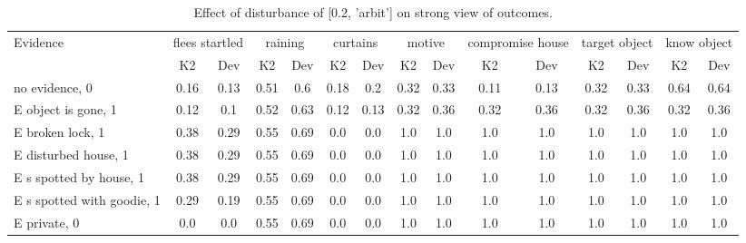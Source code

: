 \begin{table}\begin{tabular}{l|cc|cc|cc|cc|cc|cc|cc}\toprule\multirow{2}{*}{Evidence} & \multicolumn{2}{c}{flees startled}& \multicolumn{2}{c}{raining}& \multicolumn{2}{c}{curtains}& \multicolumn{2}{c}{motive}& \multicolumn{2}{c}{compromise house}& \multicolumn{2}{c}{target object}& \multicolumn{2}{c}{know object}\\& {K2} & {Dev}& {K2} & {Dev}& {K2} & {Dev}& {K2} & {Dev}& {K2} & {Dev}& {K2} & {Dev}& {K2} & {Dev}\\\midrule
no evidence, 0 & 0.16&0.13&\cellcolor{Bittersweet}0.51&\cellcolor{Bittersweet}0.6&0.18&0.2&0.32&0.33&0.11&0.13&0.32&0.33&0.64&0.64\\E object is gone, 1 & 0.12&0.1&\cellcolor{Bittersweet}0.52&\cellcolor{Bittersweet}0.63&0.12&0.13&0.32&0.36&0.32&0.36&0.32&0.36&0.32&0.36\\E broken lock, 1 & \cellcolor{Bittersweet}0.38&\cellcolor{Bittersweet}0.29&\cellcolor{Bittersweet}0.55&\cellcolor{Bittersweet}0.69&0.0&0.0&1.0&1.0&1.0&1.0&1.0&1.0&1.0&1.0\\E disturbed house, 1 & \cellcolor{Bittersweet}0.38&\cellcolor{Bittersweet}0.29&\cellcolor{Bittersweet}0.55&\cellcolor{Bittersweet}0.69&0.0&0.0&1.0&1.0&1.0&1.0&1.0&1.0&1.0&1.0\\E s spotted by house, 1 & \cellcolor{Bittersweet}0.38&\cellcolor{Bittersweet}0.29&\cellcolor{Bittersweet}0.55&\cellcolor{Bittersweet}0.69&0.0&0.0&1.0&1.0&1.0&1.0&1.0&1.0&1.0&1.0\\E s spotted with goodie, 1 & \cellcolor{Bittersweet}0.29&\cellcolor{Bittersweet}0.19&\cellcolor{Bittersweet}0.55&\cellcolor{Bittersweet}0.69&0.0&0.0&1.0&1.0&1.0&1.0&1.0&1.0&1.0&1.0\\E private, 0 & 0.0&0.0&\cellcolor{Bittersweet}0.55&\cellcolor{Bittersweet}0.69&0.0&0.0&1.0&1.0&1.0&1.0&1.0&1.0&1.0&1.0\\\bottomrule\end{tabular}\caption{Effect of disturbance of [0.2, 'arbit'] on strong view of outcomes.}\end{table}